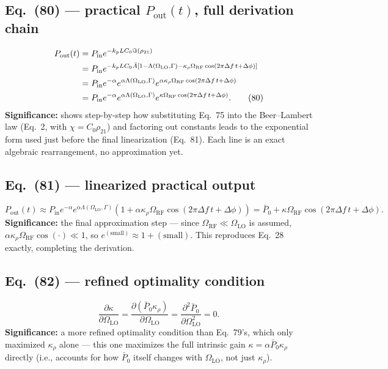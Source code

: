 \documentclass[11pt]{article}
\begin{document}
\subsection*{Eq.~(80) --- practical $P_\text{out}(t)$, full derivation chain}
\begin{align}
P_\text{out}(t)
&= P_\text{in}e^{-k_pLC_0\Im(\rho_{21})} \notag\\
&= P_\text{in}e^{-k_pLC_0\bar A[1-\Lambda(\Omega_\text{LO},\Gamma)-\kappa_\rho\Omega_\text{RF}\cos(2\pi\Delta f\,t+\Delta\phi)]} \notag\\
&= P_\text{in}e^{-\alpha}e^{\alpha\Lambda(\Omega_\text{LO},\Gamma)}e^{\alpha\kappa_\rho\Omega_\text{RF}\cos(2\pi\Delta f\,t+\Delta\phi)} \notag\\
&= P_\text{in}e^{-\alpha}e^{\alpha\Lambda(\Omega_\text{LO},\Gamma)}e^{\kappa\Omega_\text{RF}\cos(2\pi\Delta f\,t+\Delta\phi)}. \tag{80}
\end{align}
\textbf{Significance:} shows step-by-step how substituting Eq.~75 into
the Beer--Lambert law (Eq.~2, with $\chi=C_0\rho_{21}$) and factoring
out constants leads to the exponential form used just before the final
linearization (Eq.~81). Each line is an exact algebraic rearrangement,
no approximation yet.

\subsection*{Eq.~(81) --- linearized practical output}
\begin{equation}
P_\text{out}(t) \approx P_\text{in}e^{-\alpha}e^{\alpha\Lambda(\Omega_\text{LO},\Gamma)}(1+\alpha\kappa_\rho\Omega_\text{RF}\cos(2\pi\Delta f\,t+\Delta\phi)) = \bar P_0+\kappa\Omega_\text{RF}\cos(2\pi\Delta f\,t+\Delta\phi). \tag{81}
\end{equation}
\textbf{Significance:} the final approximation step --- since
$\Omega_\text{RF}\ll\Omega_\text{LO}$ is assumed,
$\alpha\kappa_\rho\Omega_\text{RF}\cos(\cdot)\ll1$, so
$e^{(\text{small})}\approx1+(\text{small})$. This reproduces Eq.~28
exactly, completing the derivation.

\subsection*{Eq.~(82) --- refined optimality condition}
\begin{equation}
\frac{\partial\kappa}{\partial\Omega_\text{LO}} = \frac{\partial(\bar P_0\kappa_\rho)}{\partial\Omega_\text{LO}} = \frac{\partial^2\bar P_0}{\partial\Omega_\text{LO}^2} = 0. \tag{82}
\end{equation}
\textbf{Significance:} a more refined optimality condition than
Eq.~79's, which only maximized $\kappa_\rho$ alone --- this one
maximizes the full intrinsic gain $\kappa=\alpha\bar P_0\kappa_\rho$
directly (i.e., accounts for how $\bar P_0$ itself changes with
$\Omega_\text{LO}$, not just $\kappa_\rho$).
\end{document}
